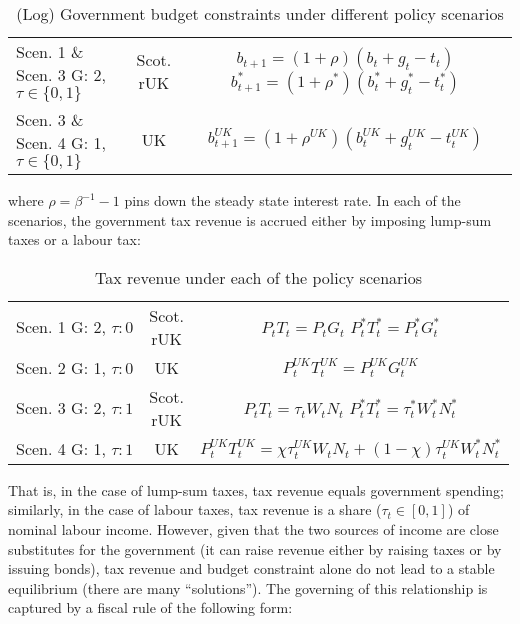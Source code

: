 \begin{table}[H]
 \renewcommand{\arraystretch}{2}
 \centering
 \begin{tabular}{l|c|c}
 \makecell{Scen. 1 \& Scen. 3\\ G: 2, $\tau \in \{0, 1\}$} & \makecell{Scot. \\ rUK } & 
 \makecell{
 $b_{t+1} = (1 + \rho)(b_t + g_t - t_t)$\\
 $b^*_{t+1} = (1 + \rho^*)(b^*_t + g^*_t - t^*_t)$
 } \\ 
 \makecell{Scen. 3 \& Scen. 4\\ G: 1, $\tau \in \{0, 1\}$} & UK & 
 $b^{UK}_{t+1} = (1 + \rho^{UK})(b^{UK}_t + g^{UK}_t - t^{UK}_t)$
 \end{tabular}
 \vspace{0.5cm}
 \caption{(Log) Government budget constraints under different policy scenarios}
\end{table}
where $\rho = \beta^{-1} - 1$ pins down the steady state interest rate. In each of the scenarios, the government tax revenue is accrued either by imposing lump-sum taxes or a labour tax:
\begin{table}[H]
 \renewcommand{\arraystretch}{2}
 \centering
 \begin{tabular}{l|c|c}
 \makecell{Scen. 1 \\ G: 2, $\tau: 0$} & \makecell{Scot. \\ rUK } & 
 \makecell{
 $P_t T_t = P_tG_t$\\
 $ P^*_tT^*_t = P^*_tG^*_t $
 } \\ 
 \makecell{Scen. 2 \\ G: 1, $\tau: 0$} & UK & 
 $P^{UK}_tT^{UK}_t = P^{UK}_tG^{UK}_t$\\
 \makecell{Scen. 3 \\ G: 2, $\tau: 1$} & \makecell{Scot. \\ rUK } & 
 \makecell{
 $P_tT_t = \tau_tW_t N_t$\\ 
 $P^*_tT^*_t = \tau^*_tW^*_t N^*_t$
 } \\
 \makecell{Scen. 4 \\ G: 1, $\tau: 1$} & UK & 
 $P^{UK}_tT^{UK}_t = \chi\tau^{UK}_tW_t N_t + (1-\chi)\tau^{UK}_tW^*_t N^*_t$
 \end{tabular}
 \vspace{0.5cm}
 \caption{Tax revenue under each of the policy scenarios}
\end{table}
That is, in the case of lump-sum taxes, tax revenue equals government spending; similarly, in the case of labour taxes, tax revenue is a share ($ \tau_t \in [0,1]$) of nominal labour income. However, given that the two sources of income are close substitutes for the government (it can raise revenue either by raising taxes or by issuing bonds), tax revenue and budget constraint alone do not lead to a stable equilibrium (there are many ``solutions''). The governing of this relationship is captured by a fiscal rule of the following form:
